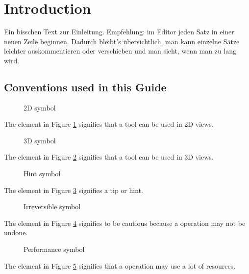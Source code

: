 \section{Introduction}
Ein bisschen Text zur Einleitung.
Empfehlung: im Editor jeden Satz in einer neuen Zeile beginnen.
Dadurch bleibt's übersichtlich, man kann einzelne Sätze leichter auskommentieren oder verschieben und man sieht, wenn man zu lang wird.

\subsection{Conventions used in this Guide}
\begin{figure}[h!] %
	\centering
	
	\caption{2D symbol}
	\label{fig:2d_icon}
\end{figure}
\noindent
The element in Figure \ref{fig:2d_icon} signifies that a tool can be used in 2D views.\newline

\begin{figure}[h!] %
	\centering
	
	\caption{3D symbol}
	\label{fig:3d_icon}
\end{figure}
\noindent
The element in Figure \ref{fig:3d_icon} signifies that a tool can be used in 3D views.\newline

\begin{figure}[h!] %
	\centering
	
	\caption{Hint symbol}
	\label{fig:hint_icon}
\end{figure}
\noindent
The element in Figure \ref{fig:hint_icon} signifies a tip or hint.\newline

\begin{figure}[h!] %
	\centering
	
	\caption{Irreversible symbol}
	\label{fig:noundo_icon}
\end{figure}
\noindent
The element in Figure \ref{fig:noundo_icon} signifies to be cautious because a operation may not be undone.\pagebreak

\begin{figure}[h!] %
	\centering
	
	\caption{Performance symbol}
	\label{fig:performance_icon}
\end{figure}
\noindent
The element in Figure \ref{fig:performance_icon} signifies that a operation may use a lot of resources.\newline


